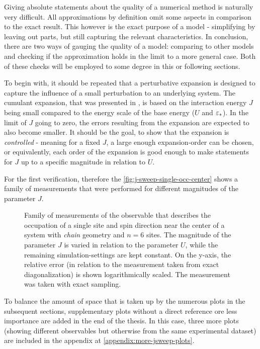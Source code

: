 Giving absolute statements about the quality of a numerical method is naturally very difficult.
All approximations by definition omit some aspects in comparison to the exact result.
This however is the exact purpose of a model - simplifying by leaving out parts, but still capturing the relevant characteristics.
In conclusion, there are two ways of gauging the quality of a model: comparing to other models and checking if the approximation holds in the limit to a more general case.
Both of these checks will be employed to some degree in this or following sections.

To begin with, it should be repeated that a perturbative expansion is designed to capture the influence of a \glqq small\grqq{} perturbation to an underlying system.
The cumulant expansion, that was presented in , is based on the interaction energy $J$ being small compared to the energy scale of the base energy ($U$ and $\epsl[\ast]$).
In the limit of $J$ going to zero, the errors resulting from the expansion are expected to also become smaller.
It should be the goal, to show that the expansion is \emph{controlled} - meaning for a fixed $J$, a large enough expansion-order can be chosen, or equivalently, each order of the expansion is good enough to make statements for $J$ up to a specific magnitude in relation to $U$. 

For the first verification, therefore the \autoref{fig:j-sweep-single-occ-center} shows a family of measurements that were performed for different magnitudes of the parameter $J$.

\begin{figure}[htbp]
    \centering
    \vspace{-0.7cm}
    \caption{
            Family of measurements of the observable that describes the occupation of a single site and spin direction near the center of a system with \emph{chain} geometry and $n=6$ sites.
            The magnitude of the parameter $J$ is varied in relation to the parameter $U$, while the remaining simulation-settings are kept constant.
            On the y-axis, the relative error (in relation to the measurement taken from exact diagonalization) is shown logarithmically scaled.
            The measurement was taken with exact sampling.
        }
    \label{fig:j-sweep-single-occ-center}
\end{figure}

To balance the amount of space that is taken up by the numerous plots in the subsequent sections, supplementary plots without a direct reference ore less importance are added in the end of the thesis.
In this case, three more plots (showing different observables but otherwise from the same experimental dataset) are included in the appendix at \ref{appendix:more-jsweep-plots}.

